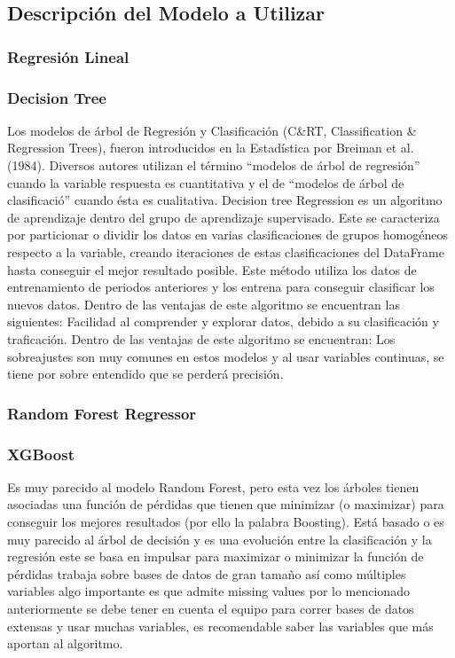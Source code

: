 \subsection{Descripci\'on del Modelo a Utilizar}

\subsubsection{Regresi\'on Lineal}

\subsubsection{Decision Tree}
Los modelos de \'arbol de Regresi\'on y Clasificaci\'on (C&RT, Classification & Regression Trees), fueron introducidos en la Estad\'istica por Breiman et al. (1984). Diversos autores utilizan el t\'ermino ``modelos de \'arbol de regresi\'on'' cuando la variable respuesta es cuantitativa y el de ``modelos de \'arbol de clasificaci\'o'' cuando \'esta es cualitativa. 
Decision tree Regression es un algoritmo de aprendizaje dentro del grupo de aprendizaje supervisado. Este se caracteriza por particionar o dividir los datos en varias clasificaciones de grupos homog\'eneos respecto a la variable, creando iteraciones de estas clasificaciones del DataFrame hasta conseguir el mejor resultado posible. Este m\'etodo utiliza los datos de entrenamiento de periodos anteriores y los entrena para conseguir clasificar los nuevos datos.
Dentro de las ventajas de este algoritmo se encuentran las siguientes:
Facilidad al comprender y explorar datos, debido a su clasificaci\'on y traficaci\'on. 
Dentro de las ventajas de este algoritmo se encuentran:
Los sobreajustes son muy comunes en estos modelos y al usar variables continuas, se tiene por sobre entendido que se perder\'a precisi\'on.

\subsubsection{Random Forest Regressor}


\subsubsection{XGBoost}
Es muy parecido al modelo Random Forest, pero esta vez los \'arboles tienen asociadas una funci\'on de p\'erdidas que tienen que minimizar (o maximizar) para conseguir los mejores resultados (por ello la palabra Boosting).
Est\'a basado o es muy parecido al \'arbol de decisi\'on y es una evoluci\'on entre la clasificaci\'on y la regresi\'on  este se basa en impulsar  para maximizar o minimizar la funci\'on de p\'erdidas trabaja sobre bases de datos de gran tamaño as\'i como m\'ultiples variables algo importante es que admite missing values  por lo mencionado anteriormente se debe tener en cuenta el equipo para  correr bases de datos extensas y usar muchas variables, es recomendable saber las variables que m\'as aportan al algoritmo.

